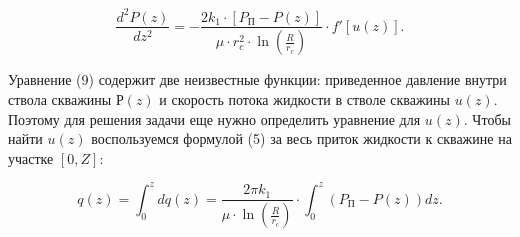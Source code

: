 \begin{equation}
\frac{d^2P(z)}{dz^2}=-\frac{2k_1\cdot[P_{\text{П}}-P(z)]}{\mu\cdot r_c^2\cdot \ln\left(\frac{R}{r_c}\right)}\cdot f'[u(z)].
\end{equation}

Уравнение (9) содержит две неизвестные функции: приведенное давление
внутри ствола скважины $Р(z)$ и скорость потока жидкости в стволе
скважины $u(z)$. Поэтому для решения задачи еще нужно определить
уравнение для $u(z)$. Чтобы найти $u(z)$ воспользуемся
формулой (5) за весь приток жидкости к скважине на участке $[0,Z]$:

\begin{equation}
q(z)=\int_0^z dq(z)=\frac{2\pi k_1}{\mu\cdot\ln\left(\frac{R}{r_c}\right)}\cdot\int_0^z(P_{\text{П}}-P(z))dz.
\end{equation}


